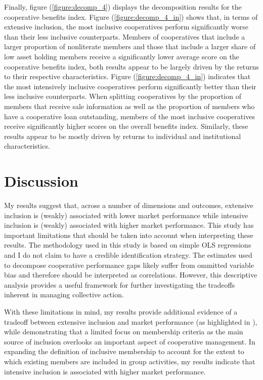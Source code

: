 \documentclass[11pt]{article}
\begin{document}
\begin{figure}[H]
\begin{subfigure}[t]{0.475\textwidth}
    \end{subfigure}
\end{figure}

Finally, figure (\ref{figure:decomp_4}) displays the decomposition results for the cooperative benefits index. Figure (\ref{figure:decomp_4_in}) shows that, in terms of extensive inclusion, the most inclusive cooperatives perform significantly worse than their less inclusive counterparts. Members of cooperatives that include a larger proportion of nonliterate members and those that include a larger share of low asset holding members receive a significantly lower average score on the cooperative benefits index, both results appear to be largely driven by the returns to their respective characteristics. Figure (\ref{figure:decomp_4_in}) indicates that the most intensively inclusive cooperatives perform significantly better than their less inclusive counterparts. When splitting cooperatives by the proportion of members that receive sale information as well as the proportion of members who have a cooperative loan outstanding, members of the most inclusive cooperatives receive significantly higher scores on the overall benefits index. Similarly, these results appear to be mostly driven by returns to individual and institutional characteristics. 


\section{Discussion}

My results suggest that, across a number of dimensions and outcomes, extensive inclusion is (weakly) associated with lower market performance while intensive inclusion is (weakly) associated with higher market performance. This study has important limitations that should be taken into account when interpreting these results. The methodology used in this study is based on simple OLS regressions and I do not claim to have a credible identification strategy. The estimates used to decompose cooperative performance gaps likely suffer from ommitted variable bias and therefore should be interpreted as correlations. However, this descriptive analysis provides a useful framework for further investigating the tradeoffs inherent in managing collective action. 

With these limitations in mind, my results provide additional evidence of a tradeoff between extensive inclusion and market performance (as highlighted in \citet{bernard_reaching_2009}), while demonstrating that a limited focus on membership criteria as the main source of inclusion overlooks an important aspect of cooperative management. In expanding the definition of inclusive membership to account for the extent to which existing members are included in group activities, my results indicate that intensive inclusion is associated with higher market performance. 
\end{document}
